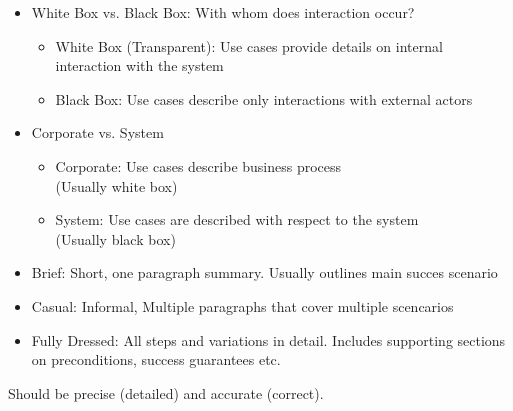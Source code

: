 \documentclass[
../../Software_Engineering_Summary.tex,
]
{subfiles}
\begin{document}
\begin{greenbox}
    \begin{itemize}
        \item White Box vs. Black Box: With whom does interaction occur?
        \begin{itemize}
            \item White Box (Transparent): Use cases provide details on internal interaction with the system
            \item Black Box: Use cases describe only interactions with external actors 
        \end{itemize}
        \item Corporate vs. System
        \begin{itemize}
            \item Corporate: Use cases describe business process\\ (Usually white box)
            \item System: Use cases are described with respect to the system \\ (Usually black box)
        \end{itemize}
    \end{itemize}
\end{greenbox}

\begin{greenbox}
    \begin{itemize}
        \item Brief: Short, one paragraph summary. Usually outlines main succes scenario
        \item Casual: Informal, Multiple paragraphs that cover multiple scencarios
        \item Fully Dressed: All steps and variations in detail. Includes supporting sections on preconditions, success guarantees etc.
    \end{itemize}
    Should be precise (detailed) and accurate (correct).
\end{greenbox}
\end{document}
